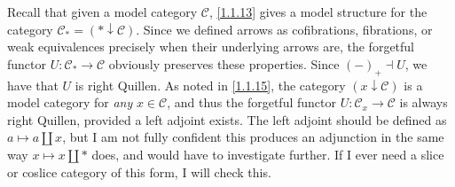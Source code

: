 \begin{example}\label{3.1.9}
	Recall that given a model category $\mathcal{C} $, \cref{1.1.13} gives a model structure for the category $\mathcal{C}_*=(*\downarrow \mathcal{C} )$. Since we defined arrows as cofibrations, fibrations, or weak equivalences precisely when their underlying arrows are, the forgetful functor $U : \mathcal{C} _* \to \mathcal{C} $ obviously preserves these properties. Since $(-)_+\dashv U$, we have that $U$ is right Quillen. As noted in \cref{1.1.15}, the category $(x\downarrow \mathcal{C} )$ is a model category for \emph{any} $x\in \mathcal{C} $, and thus the forgetful functor $U : \mathcal{C} _x \to \mathcal{C} $ is always right Quillen, provided a left adjoint exists. The left adjoint should be defined as $a\mapsto a\amalg x$, but I am not fully confident this produces an adjunction in the same way $x\mapsto x\amalg *$ does, and would have to investigate further. If I ever need a slice or coslice category of this form, I will check this.
\end{example}


